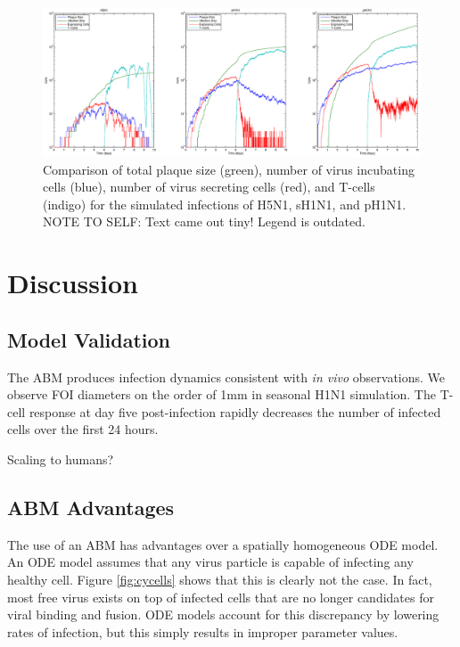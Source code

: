 \documentclass[10pt]{article}
\begin{document}
\begin{figure}[ht!]
\begin{center}
 \includegraphics[width=\textwidth]{plaquesize}
 \end{center}
\caption{Comparison of total plaque size (green), number of virus incubating cells (blue), number of virus secreting cells (red), and T-cells (indigo) for the simulated infections of H5N1, sH1N1, and pH1N1.  NOTE TO SELF: Text came out tiny!  Legend is outdated.} 
 \label{fig:plaquesize}
\end{figure}


\section*{Discussion}

\subsection*{Model Validation}

The ABM produces infection dynamics consistent with \textit{in vivo} observations.  We observe FOI diameters on the order of 1mm in seasonal H1N1 simulation.  The T-cell response at day five post-infection rapidly decreases the number of infected cells over the first 24 hours.

Scaling to humans?

\subsection*{ABM Advantages}

The use of an ABM has advantages over a spatially homogeneous ODE model.  An ODE model assumes that any virus particle is capable of infecting any healthy cell.  Figure \ref{fig:cycells} shows that this is clearly not the case.  In fact, most free virus exists on top of infected cells that are no longer candidates for viral binding and fusion.  ODE models account for this discrepancy by lowering rates of infection, but this simply results in improper parameter values. 
\end{document}
